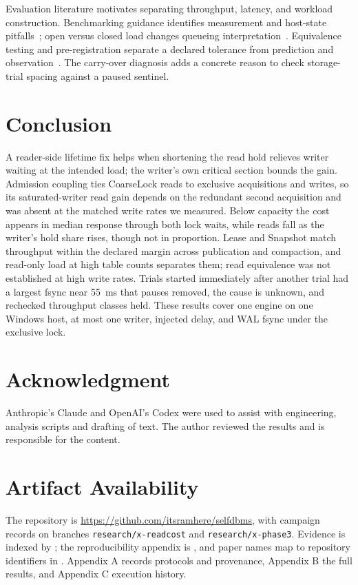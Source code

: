 \documentclass[conference]{IEEEtran}
\begin{document}
Evaluation literature motivates separating throughput, latency, and workload construction. Benchmarking guidance identifies measurement and host-state pitfalls~\cite{georges2007,hoefler2015,traeger2008,mytkowicz2009}; open versus closed load changes queueing interpretation~\cite{schroeder2006}. Equivalence testing and pre-registration separate a declared tolerance from prediction and observation~\cite{lakens2017,nosek2018}. The carry-over diagnosis adds a concrete reason to check storage-trial spacing against a paused sentinel.

\section{Conclusion}
A reader-side lifetime fix helps when shortening the read hold relieves writer waiting at the intended load; the writer's own critical section bounds the gain. Admission coupling ties CoarseLock reads to exclusive acquisitions and writes, so its saturated-writer read gain depends on the redundant second acquisition and was absent at the matched write rates we measured. Below capacity the cost appears in median response through both lock waits, while reads fall as the writer's hold share rises, though not in proportion. Lease and Snapshot match throughput within the declared margin across publication and compaction, and read-only load at high table counts separates them; read equivalence was not established at high write rates. Trials started immediately after another trial had a largest fsync near 55~ms that pauses removed, the cause is unknown, and rechecked throughput classes held. These results cover one engine on one Windows host, at most one writer, injected delay, and WAL fsync under the exclusive lock.

\section*{Acknowledgment}
Anthropic's Claude and OpenAI's Codex were used to assist with engineering, analysis scripts and drafting of text. The author reviewed the results and is responsible for the content.
\section*{Artifact Availability}
The repository is \url{https://github.com/itsramhere/selfdbms}, with campaign records on branches \texttt{research/x-readcost} and \texttt{research/x-phase3}. Evidence is indexed by ; the reproducibility appendix is , and paper names map to repository identifiers in . Appendix A records protocols and provenance, Appendix B the full results, and Appendix C execution history.
\end{document}
